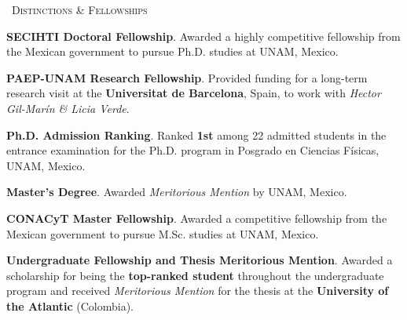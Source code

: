 \begin{rubric}{\faTrophy\ \textsc{Distinctions \& Fellowships}}

\entry*[2022--present]%
  \textbf{SECIHTI Doctoral Fellowship}. Awarded a highly competitive fellowship from the Mexican government to pursue Ph.D. studies at UNAM, Mexico. \par

\entry*[2023]%
  \textbf{PAEP-UNAM Research Fellowship}. Provided funding for a long-term research visit at the \textbf{Universitat de Barcelona}, Spain, to work with \textit{Hector Gil-Marín \& Licia Verde}.

\entry*[2022]%
  \textbf{Ph.D. Admission Ranking}. Ranked \textbf{1st} among 22 admitted students in the entrance examination for the Ph.D. program in Posgrado en Ciencias Físicas, UNAM, Mexico.

\entry*[2021]%
  \textbf{Master’s Degree}. Awarded \textit{Meritorious Mention} by UNAM, Mexico.

\entry*[2020--2021]%
  \textbf{CONACyT Master Fellowship}. Awarded a competitive fellowship from the Mexican government to pursue M.Sc. studies at UNAM, Mexico.

\entry*[2014--2019]%
  \textbf{Undergraduate Fellowship and Thesis Meritorious Mention}. Awarded a scholarship for being the \textbf{top-ranked student} throughout the undergraduate program and received \textit{Meritorious Mention} for the thesis at the \textbf{University of the Atlantic} (Colombia).






\end{rubric}
